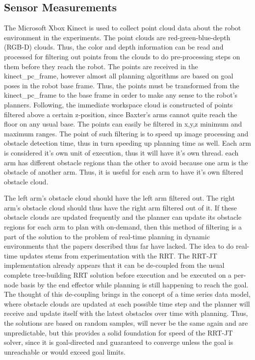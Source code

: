 \documentclass[conference]{IEEEtran} \usepackage[T1]{fontenc} \usepackage[backend=biber, style=ieee]{biblatex}
\begin{document}
\subsection{Sensor Measurements} \label{Sensor Measurements}

The Microsoft Xbox Kinect is used to collect point cloud data about the robot environment in the experiments. The point clouds are red-green-blue-depth (RGB-D) clouds. 
Thus, the color and depth information can be read and processed for filtering out points from the clouds to do pre-processing steps on them before they reach the robot. 
The points are received in the kinect\_pc\_frame, however almost all planning algorithms are based on goal poses in the robot base frame. Thus, the points must be 
transformed from the kinect\_pc\_frame to the base frame in order to make any sense to the robot's planners. Following, the immediate workspace cloud is constructed of 
points filtered above a certain z-position, since Baxter's arms cannot quite reach the floor on any usual base. The points can easily be filtered in x,y,z minimum and 
maximum ranges. The point of such filtering is to speed up image processing and obstacle detection time, thus in turn speeding up planning time as well. Each arm is 
considered it's own unit of execution, thus it will have it's own thread. each arm has different obstacle regions than the other to avoid because one arm is the obstacle
of another arm. Thus, it is useful for each arm to have it's own filtered obstacle cloud. 

The left arm's obstacle cloud should have the left arm filtered out. The right arm's obstacle cloud should thus have the right arm filtered out of it. If these obstacle
clouds are updated frequently and the planner can update its obstacle regions for each arm to plan with on-demand, then this method of filtering is a part of the solution
to the problem of real-time planning in dynamic environments that the papers described thus far have lacked. The idea to do real-time updates stems from experimentation
with the RRT. The RRT-JT implementation already appears that it can be de-coupled from the usual complete tree-building RRT solution before execution and be executed on a 
per-node basis by the end effector while planning is still happening to reach the goal. The thought of this de-coupling brings in the concept of a time series data model, 
where obstacle clouds are updated at each possible time step and the planner will receive and update itself with the latest obstacles over time with planning. Thus, the 
solutions are based on random samples, will never be the same again and are unpredictable, but this provides a solid foundation for speed of the RRT-JT solver, since
it is goal-directed and guaranteed to converge unless the goal is unreachable or would exceed goal limits.
\end{document}
